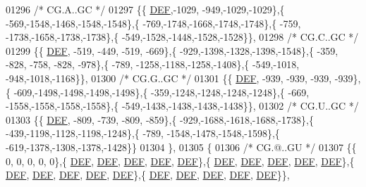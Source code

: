 \begin{DoxyCode}
01296 \textcolor{comment}{/* CG.A..GC */}
01297 \{\{  \mbox{\hyperlink{1_88_84__epars_8h_a397419fc12b37ed479c8abb9d444d843}{DEF}},-1029, -949,-1029,-1029\},\{ -569,-1548,-1468,-1548,-1548\},\{ -769,-1748,-1668,-1748,-1748\},\{ -759,
      -1738,-1658,-1738,-1738\},\{ -549,-1528,-1448,-1528,-1528\}\},
01298 \textcolor{comment}{/* CG.C..GC */}
01299 \{\{  \mbox{\hyperlink{1_88_84__epars_8h_a397419fc12b37ed479c8abb9d444d843}{DEF}}, -519, -449, -519, -669\},\{ -929,-1398,-1328,-1398,-1548\},\{ -359, -828, -758, -828, -978\},\{ -789,
      -1258,-1188,-1258,-1408\},\{ -549,-1018, -948,-1018,-1168\}\},
01300 \textcolor{comment}{/* CG.G..GC */}
01301 \{\{  \mbox{\hyperlink{1_88_84__epars_8h_a397419fc12b37ed479c8abb9d444d843}{DEF}}, -939, -939, -939, -939\},\{ -609,-1498,-1498,-1498,-1498\},\{ -359,-1248,-1248,-1248,-1248\},\{ -669,
      -1558,-1558,-1558,-1558\},\{ -549,-1438,-1438,-1438,-1438\}\},
01302 \textcolor{comment}{/* CG.U..GC */}
01303 \{\{  \mbox{\hyperlink{1_88_84__epars_8h_a397419fc12b37ed479c8abb9d444d843}{DEF}}, -809, -739, -809, -859\},\{ -929,-1688,-1618,-1688,-1738\},\{ -439,-1198,-1128,-1198,-1248\},\{ -789,
      -1548,-1478,-1548,-1598\},\{ -619,-1378,-1308,-1378,-1428\}\}
01304 \},
01305 \{
01306 \textcolor{comment}{/* CG.@..GU */}
01307 \{\{    0,    0,    0,    0,    0\},\{  \mbox{\hyperlink{1_88_84__epars_8h_a397419fc12b37ed479c8abb9d444d843}{DEF}},  \mbox{\hyperlink{1_88_84__epars_8h_a397419fc12b37ed479c8abb9d444d843}{DEF}},  \mbox{\hyperlink{1_88_84__epars_8h_a397419fc12b37ed479c8abb9d444d843}{DEF}},  \mbox{\hyperlink{1_88_84__epars_8h_a397419fc12b37ed479c8abb9d444d843}{DEF}},  \mbox{\hyperlink{1_88_84__epars_8h_a397419fc12b37ed479c8abb9d444d843}{DEF}}\},\{  
      \mbox{\hyperlink{1_88_84__epars_8h_a397419fc12b37ed479c8abb9d444d843}{DEF}},  \mbox{\hyperlink{1_88_84__epars_8h_a397419fc12b37ed479c8abb9d444d843}{DEF}},  \mbox{\hyperlink{1_88_84__epars_8h_a397419fc12b37ed479c8abb9d444d843}{DEF}},  \mbox{\hyperlink{1_88_84__epars_8h_a397419fc12b37ed479c8abb9d444d843}{DEF}},  \mbox{\hyperlink{1_88_84__epars_8h_a397419fc12b37ed479c8abb9d444d843}{DEF}}\},\{  \mbox{\hyperlink{1_88_84__epars_8h_a397419fc12b37ed479c8abb9d444d843}{DEF}},  \mbox{\hyperlink{1_88_84__epars_8h_a397419fc12b37ed479c8abb9d444d843}{DEF}},  \mbox{\hyperlink{1_88_84__epars_8h_a397419fc12b37ed479c8abb9d444d843}{DEF}},  \mbox{\hyperlink{1_88_84__epars_8h_a397419fc12b37ed479c8abb9d444d843}{DEF}},  
      \mbox{\hyperlink{1_88_84__epars_8h_a397419fc12b37ed479c8abb9d444d843}{DEF}}\},\{  \mbox{\hyperlink{1_88_84__epars_8h_a397419fc12b37ed479c8abb9d444d843}{DEF}},  \mbox{\hyperlink{1_88_84__epars_8h_a397419fc12b37ed479c8abb9d444d843}{DEF}},  \mbox{\hyperlink{1_88_84__epars_8h_a397419fc12b37ed479c8abb9d444d843}{DEF}},  \mbox{\hyperlink{1_88_84__epars_8h_a397419fc12b37ed479c8abb9d444d843}{DEF}},  \mbox{\hyperlink{1_88_84__epars_8h_a397419fc12b37ed479c8abb9d444d843}{DEF}}\}\},

\end{DoxyCode}
